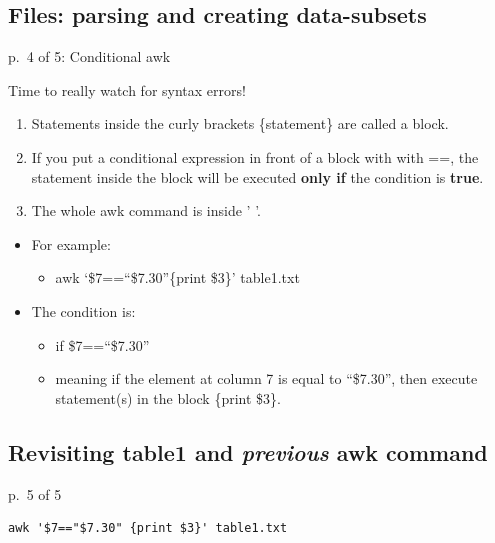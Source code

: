 \documentclass[
]{book}
\providecommand{\tightlist}{%
  \setlength{\itemsep}{0pt}\setlength{\parskip}{0pt}}
\begin{document}
\hypertarget{files-parsing-and-creating-data-subsets-3}{%
\subsection{Files: parsing and creating data-subsets}\label{files-parsing-and-creating-data-subsets-3}}

p.~4 of 5: Conditional awk

Time to really watch for syntax errors!

\begin{enumerate}
\def\labelenumi{\arabic{enumi})}
\item
  Statements inside the curly brackets \{statement\} are called a block.
\item
  If you put a conditional expression in front of a block with with ==, the statement inside the block will be executed \textbf{only if} the condition is \textbf{true}.
\item
  The whole awk command is inside ' '.
\end{enumerate}

\begin{itemize}
\tightlist
\item
  For example:

  \begin{itemize}
  \tightlist
  \item
    awk `\$7==``\$7.30''\{print \$3\}' table1.txt
  \end{itemize}
\item
  The condition is:

  \begin{itemize}
  \tightlist
  \item
    if \$7==``\$7.30''
  \item
    meaning if the element at column 7 is equal to ``\$7.30'', then execute statement(s) in the block \{print \$3\}.
  \end{itemize}
\end{itemize}

\hypertarget{revisiting-table1-and-previous-awk-command}{%
\subsection{\texorpdfstring{Revisiting table1 and \emph{previous} awk command}{Revisiting table1 and previous awk command}}\label{revisiting-table1-and-previous-awk-command}}

p.~5 of 5

\begin{verbatim}
awk '$7=="$7.30" {print $3}' table1.txt
\end{verbatim}
\end{document}
